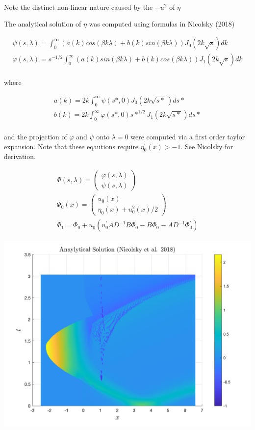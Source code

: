 \documentclass{article}
\begin{document}
\noindent Note the distinct non-linear nature caused by the $-u^2$ of $\eta$

\noindent The analytical solution of $\eta$ was computed using formulas in Nicolsky (2018)

\[
\begin{aligned}
\psi (s, \lambda ) = \int_{0}^\infty (a(k)cos(\beta k \lambda)+b(k)sin(\beta k \lambda)) J_0(2 k \sqrt s ) dk\\
\varphi (s, \lambda ) =  s^{-1/2} \int_{0}^\infty (a(k)sin(\beta k \lambda)+b(k)cos(\beta k \lambda)) J_1(2 k \sqrt s )dk \\
\end{aligned}
\]

where

\[
\begin{aligned}
a(k) = 2k \int_{0}^\infty \psi(s*,0) J_0(2 k \sqrt {s*})ds*\\
b(k) = 2k \int_{0}^\infty \varphi(s*,0) s*^{1/2} J_1(2 k \sqrt {s*})ds*\\
\end{aligned}
\]

and the projection of $\varphi$ and $\psi$ onto $\lambda = 0$ were computed via a first order taylor expansion. Note that these eqautions require $\eta_0^\prime(x) > -1$.  See Nicolsky for derivation.

\[
\begin{aligned}
\Phi (s,\lambda) = \begin{pmatrix}
\varphi(s,\lambda) \\
\psi(s,\lambda)
\end{pmatrix} \\
\Phi_0(x) =  \begin{pmatrix}
u_0(x) \\
\eta_0(x) + u_0^2(x)/2
\end{pmatrix} \\
\Phi_1 = \Phi_0 + u_0(u_0^\prime A D^{-1} B \Phi_0 - B \Phi_0 - A D^{-1} \Phi_0^\prime)
\end{aligned}
\]

\includegraphics[width=\linewidth]{ana.png}
\end{document}
